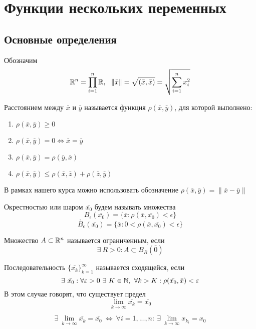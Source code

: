 \newpage
\section{Функции нескольких переменных}
\subsection{Основные определения}
Обозначим
\[\R^n=\prod\limits_{i=1}^{n}\R,\ \ \|\bar{x}\|=\sqrt{(\bar{x},\bar{x})}=\sqrt{\sum\limits_{i=1}^{n}x_i^2}\]
\begin{definition}
    Расстоянием между $\bar{x}$ и $\bar{y}$ называется функция $\rho(\bar{x}, \bar{y})$, для которой выполнено:
    \begin{enumerate}
        \item $\rho(\bar{x}, \bar{y})\geq 0$
        \item $\rho(\bar{x}, \bar{y})=0 \Leftrightarrow \bar{x}=\bar{y}$
        \item $\rho(\bar{x}, \bar{y})=\rho(\bar{y}, \bar{x})$
        \item $\rho(\bar{x}, \bar{y})\leq \rho(\bar{x}, \bar{z})+\rho(\bar{z}, \bar{y})$
    \end{enumerate}
    В рамках нашего курса можно использовать обозначение $\rho(\bar{x}, \bar{y})=\|\bar{x}-\bar{y}\|$
\end{definition} 
\begin{definition} Окрестностью или шаром $\bar{x_0}$ будем называть множества\\
    \[B_{\epsilon}(\bar{x_0})=\{\bar{x}: \rho(\bar{x}, \bar{x_0})<\epsilon\}\]
    \[\mathring{B_{\epsilon}}(\bar{x_0})=\{\bar{x}: 0<\rho(\bar{x}, \bar{x_0})<\epsilon\}\]
\end{definition}
\begin{definition}
    Множество $A\subset \mathbb{R}^n$ называется ограниченным, если 
    \[\exists\ R>0: A\subset B_{R}(\bar{0})\]
\end{definition}
\begin{definition}
    Последовательность $\{\bar{x_k}\}_{k=1}^{\infty}$ называется сходящейся, если 
    \[\exists\ \bar{x_0}: \forall \epsilon>0\ \exists\ K\in \N,\ \forall k>K: \rho(\bar{x_0}, \bar{x})<\epsilon\]
    В этом случае говорят, что существует предел
    \[\lim\limits_{k\to \infty}\bar{x_k}=\bar{x_0}\]
\end{definition} 
\begin{theorem}
    \[\exists\ \lim\limits_{k\to \infty}\bar{x_k}=\bar{x_0}\ \Leftrightarrow\ \forall i=1,...,n:\ \exists\ \lim\limits_{k\to \infty}x_{k_i}=x_0\]
\end{theorem} 
